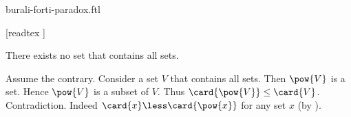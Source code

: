 \documentclass{article}
\begin{document}
\begin{smodule}{burali-forti-paradox.ftl}
  \begin{forthel}
    [readtex ]
  \end{forthel}

  \begin{ftheorem*}[label=cantor_paradox_2,title=Cantor's Second Paradox]
    There exists no set that contains all sets.
  \end{ftheorem*}
  \begin{fproof}
    Assume the contrary.
    Consider a set $V$ that contains all sets.
    Then $\pow{V}$ is a set.
    Hence $\pow{V}$ is a subset of $V$.
    Thus $\card{\pow{V}} \leq \card{V}$.
    Contradiction.
    Indeed $\card{x} \less \card{\pow{x}}$ for any set $x$ (by ).
  \end{fproof}
\end{smodule}
\end{document}
